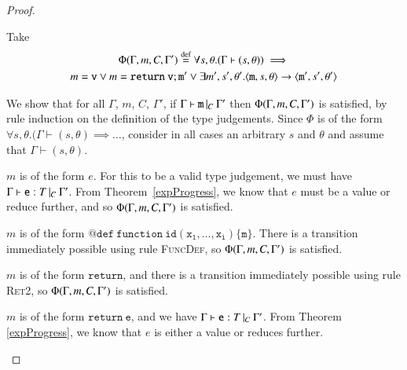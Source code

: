 \begin{proof}\label{case:prog-statProgressProof}

  Take 
  \begin{multline*}
  	\Phi(\Gamma, m, C, \Gamma') \stackrel{\text{def}}{=} 
  	\forall s,\theta. (\Gamma \vdash (s,\theta))\implies \\
  	m=\mathtt{v} \vee m=\mathtt{return\ v; m'} \vee
  	\exists m', s',\theta'. \langle{}\mathtt{m},s,\theta\rangle{}\rightarrow{}\langle{}\mathtt{m'},s',\theta'\rangle
  \end{multline*}

  We show that for all $\Gamma$, $m$, $C$, $\Gamma'$, if $\Gamma{}\vdash\mathtt{m}\, |_C \:\Gamma '$
  then $\Phi(\Gamma, m, C, \Gamma')$ is satisfied, by rule induction on the definition of the
  type judgements. Since $\Phi$ is of the form
  $\forall s,\theta.(\Gamma\vdash(s,\theta)\implies\dots$,
  consider in all cases an arbitrary $s$ and $\theta$ and assume that $\Gamma\vdash(s,\theta)$.

  \begin{case}[ExpTypable]\label{case:prog-expTypable}

	$m$ is of the form $e$. For this to be a valid type judgement, we must have
	$\Gamma{}\vdash\mathtt{e}: T\,|_C\:\Gamma'$. From Theorem~\ref{expProgress}, we know that $e$ must be a
	value or reduce further, and so $\Phi(\Gamma, m, C, \Gamma')$ is satisfied.

  \end{case}

  \begin{case}[FunDef]\label{case:prog-funDef}

	$m$ is of the form $\mathtt{@def\ function\ id(x_1, \dots, x_i)\{m\}}$. There
	is a transition immediately possible using rule \textsc{FuncDef}, so $\Phi(\Gamma, m, C, \Gamma')$
	is satisfied.

  \end{case}

  \begin{case}[RetTypable1]\label{case:prog-retTypable1}

  	$m$ is of the form $\mathtt{return}$, and there is a transition immediately
  	possible using rule \textsc{Ret2}, so $\Phi(\Gamma, m, C, \Gamma')$ is satisfied. 

  \end{case}

  \begin{case}\label{case:prog-retTypable}

  	$m$ is of the form $\mathtt{return\ e}$, and we have $\Gamma{}\vdash\mathtt{e}: T\,|_C\:\Gamma'$. From
  	Theorem \ref{expProgress}, we know that $e$ is either a value or reduces
  	further.


\end{case}
\end{proof}

